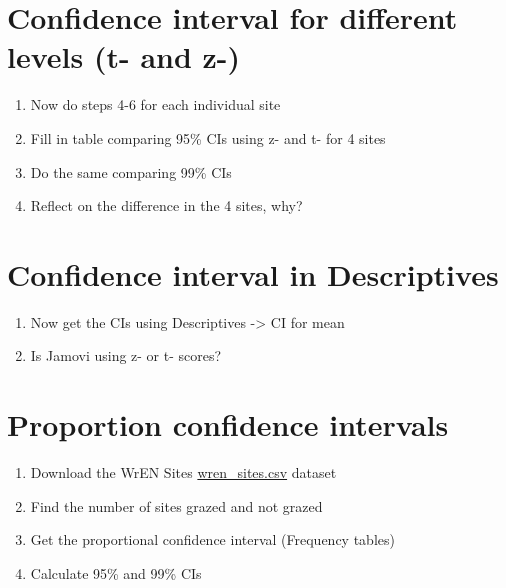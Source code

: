 \documentclass[
]{scrbook}
\providecommand{\tightlist}{%
  \setlength{\itemsep}{0pt}\setlength{\parskip}{0pt}}
\begin{document}
\hypertarget{confidence-interval-for-different-levels-t--and-z-}{%
\section{Confidence interval for different levels (t- and z-)}\label{confidence-interval-for-different-levels-t--and-z-}}

\begin{enumerate}
\def\labelenumi{\arabic{enumi}.}
\tightlist
\item
  Now do steps 4-6 for each individual site
\item
  Fill in table comparing 95\% CIs using z- and t- for 4 sites
\item
  Do the same comparing 99\% CIs
\item
  Reflect on the difference in the 4 sites, why?
\end{enumerate}

\hypertarget{confidence-interval-in-descriptives}{%
\section{Confidence interval in Descriptives}\label{confidence-interval-in-descriptives}}

\begin{enumerate}
\def\labelenumi{\arabic{enumi}.}
\tightlist
\item
  Now get the CIs using Descriptives -\textgreater{} CI for mean
\item
  Is Jamovi using z- or t- scores?
\end{enumerate}

\hypertarget{proportion-confidence-intervals}{%
\section{Proportion confidence intervals}\label{proportion-confidence-intervals}}

\begin{enumerate}
\def\labelenumi{\arabic{enumi}.}
\tightlist
\item
  Download the WrEN Sites \href{https://raw.githubusercontent.com/bradduthie/statistical_techniques/main/data/wren_sites.csv}{wren\_sites.csv} dataset
\item
  Find the number of sites grazed and not grazed
\item
  Get the proportional confidence interval (Frequency tables)
\item
  Calculate 95\% and 99\% CIs
\end{enumerate}
\end{document}

